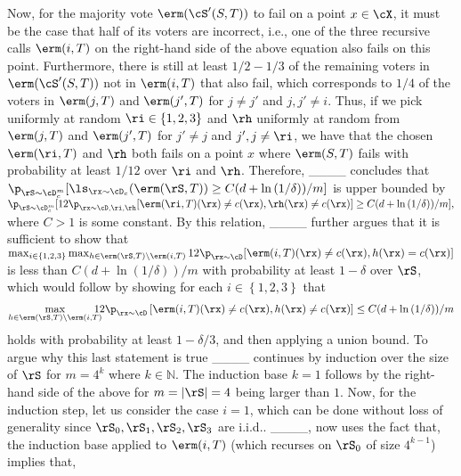Now, for the majority vote $\erm(\cS'(S,T))$ to fail on a point $x\in\cX$, it must be the case that half of its voters are incorrect, i.e., one of the three recursive calls $\erm(i,T)$ on the right-hand side of the above equation also fails on this point. Furthermore, there is still at least $1/2-1/3$ of the remaining voters in $\erm(\cS'(S,T))$ not in $\erm(i,T)$ that also fail, which corresponds to $1/4$ of the voters in $\erm(j,T)$ and $\erm(j',T)$ for $ j\not= j' $ and $ j,j'\not=i.$ Thus, if we pick uniformly at random $\ri\in\left\{ 1,2,3 \right\}$ and $\rh$ uniformly at random from $\erm(j,T)$ and $\erm(j',T)$ for $j'\not=j$ and $j',j\not=\ri$, we have that the chosen $\erm(\ri,T)$ and $\rh$ both fails on a point $x$ where $\erm(S,T)$ fails with probability at least $1/12$ over $\ri$ and $\rh$. Therefore, ____ concludes that 
$ \p_{\rS\sim\cD_c^m}[\ls_{\rx\sim\cD_{c}}(\erm(\rS,T))\geq C(d+\ln{\left(1/\delta \right)})/m]$ is upper bounded by $\p_{\rS\sim\cD_c^m}[12\p_{\rx\sim\cD,\ri,\rh}[\erm(\ri,T)(\rx)\not=c(\rx),\rh(\rx)\not=c(\rx)]\geq C(d+\ln{\left(1/\delta \right)})/m],
$ where $C>1$ is some constant. By this relation, ____ further argues that it is sufficient to show that $
    \max_{i\in\left\{ 1,2,3 \right\}}\max_{h\in \tiny\erm(\rS,T)\backslash\erm(i,T)}   12\p_{\rx\sim\cD}[\erm(i,T)(\rx)\not=c(\rx),h(\rx)=c(\rx)]$ is less than $ C(d+\ln{(1/\delta )})/m $
 with probability at least $ 1-\delta $ over $\rS$, which would follow by showing for each $i\in\left\{ 1,2,3 \right\}$ that 
\begin{align}\label{eq:intro1}
  \vspace{-0.6cm}
\max_{h\in \erm(\rS,T)\backslash\erm(i,T)} \negmedspace \negmedspace \negmedspace \negmedspace   12\p_{\rx\sim\cD}\left[\erm(i,T)(\rx)\not= c(\rx),h(\rx)\not=c(\rx)\right]\leq C(d+\ln{\left(1/\delta \right)})/m 
\end{align}
\vspace{-0.4cm}\newline holds with probability at least $1-\delta/3$, and then applying a union bound. 
To argue why this last statement is true ____ continues by induction over the size of $\rS$ for $m=4^{k}$ where $ k\in\mathbb{N} $. The induction base $k=1$ follows by the right-hand side of the above for $m=|\rS|=4$ being larger than $1$. Now, for the induction step, let us consider the case $i=1$, which can be done without loss of generality since $\rS_{0},\rS_{1},\rS_{2},\rS_{3}$ are i.i.d.. ____, now uses the fact that, the induction base applied to $\erm(i,T)$ (which recurses on $\rS_{0}$ of size $4^{k-1}$) implies that,
